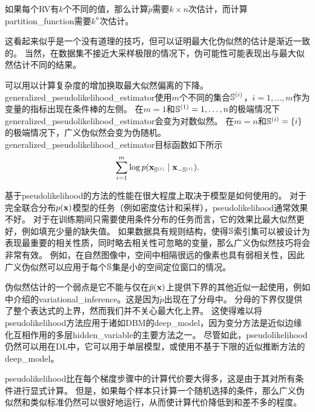 如果每个\gls{RV}有$k$个不同的值，那么计算$\tilde{p}$需要$k\times n$次估计，而计算\gls{partition_function}需要$k^n$次估计。


这看起来似乎是一个没有道理的技巧，但可以证明最大化伪似然的估计是渐近一致的\citep{Mase1995}。
当然，在数据集不接近大采样极限的情况下，伪可能性可能表现出与最大似然估计不同的结果。


可以用以计算复杂度的增加换取最大似然偏离的下降\citep{Huang02}。
\gls{generalized_pseudolikelihood_estimator}使用$m$个不同的集合$\mathbb{S}^{(i)}$，$i=1, \dots, m$作为变量的指标出现在条件棒的左侧。
在$m = 1$和$\mathbb{S}^{(1)}= 1, \dots, n$的极端情况下\gls{generalized_pseudolikelihood_estimator}会变为对数似然。
在$m = n$和$\mathbb{S}^{(i)} = \{i\}$的极端情况下，广义伪似然会变为伪随机。
\gls{generalized_pseudolikelihood_estimator}目标函数如下所示
\begin{equation}
	\sum_{i=1}^m \log p(\mathbf{x}_{\mathbb{S}^{(i)}} \mid \mathbf{x}_{- \mathbb{S}^{(i)} }).
\end{equation}


基于\gls{pseudolikelihood}的方法的性能在很大程度上取决于模型是如何使用的。
对于完全联合分布$p(\mathbf{x})$模型的任务（例如密度估计和采样），\gls{pseudolikelihood}通常效果不好。
对于在训练期间只需要使用条件分布的任务而言，它的效果比最大似然更好，例如填充少量的缺失值。
如果数据具有规则结构，使得$\mathbb{S}$索引集可以被设计为表现最重要的相关性质，同时略去相关性可忽略的变量，那么广义伪似然技巧将会非常有效。
例如，在自然图像中，空间中相隔很远的像素也具有弱相关性，因此广义伪似然可以应用于每个$\mathbb{S}$集是小的空间定位窗口的情况。


伪似然估计的一个弱点是它不能与仅在$\tilde{p}(\mathbf{x})$上提供下界的其他近似一起使用，例如中介绍的\gls{variational_inference}。这是因为$\tilde{p}$出现在了分母中。
分母的下界仅提供了整个表达式的上界，然而我们并不关心最大化上界。
这使得难以将\gls{pseudolikelihood}方法应用于诸如\gls{DBM}的\gls{deep_model}，因为变分方法是近似边缘化互相作用的多层\gls{hidden_variable}的主要方法之一。
尽管如此，\gls{pseudolikelihood}仍然可以用在\gls{DL}中，它可以用于单层模型，或使用不基于下限的近似推断方法的\gls{deep_model}。


\gls{pseudolikelihood}比在每个梯度步骤中的计算代价要大得多，这是由于其对所有条件进行显式计算。
但是，如果每个样本只计算一个随机选择的条件，那么广义伪似然和类似标准仍然可以很好地运行，从而使计算代价降低到和差不多的程度\citep{Goodfellow-et-al-NIPS2013}。


